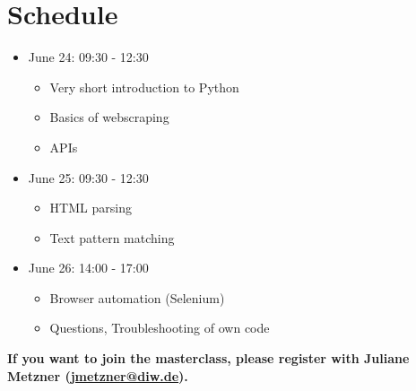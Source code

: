 \documentclass[a4paper]{article}
\begin{document}
\section{Schedule}

\begin{itemize}
    \item June 24: 09:30 - 12:30
    \begin{itemize}
        \item Very short introduction to Python
        \item Basics of webscraping
        \item APIs
    \end{itemize}
    \item June 25: 09:30 - 12:30
    \begin{itemize}
        \item HTML parsing
        \item Text pattern matching
    \end{itemize}
    \item June 26: 14:00 - 17:00
    \begin{itemize}
        \item Browser automation (Selenium)
        \item Questions, Troubleshooting of own code
    \end{itemize}
\end{itemize}

\textbf{If you want to join the masterclass, please register with
  Juliane Metzner (\href{mailto:jmetzner@diw.de?subject=BCCP Web Scraping Course}{jmetzner@diw.de}).}
\end{document}
